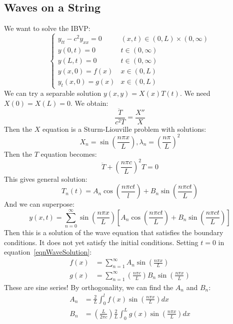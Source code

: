 \documentclass[../Main.tex]{subfiles}
\begin{document}
\subsection{Waves on a String}
We want to solve the IBVP:
\begin{equation*}
    \begin{cases}
        y_{tt} - c^2y_{xx} = 0 & (x, t) \in (0, L) \times (0, \infty) \\
        y(0, t) = 0 & t \in (0, \infty) \\
        y(L, t) = 0 & t \in (0, \infty) \\
        y(x, 0) = f(x) & x \in (0, L) \\
        y_t(x, 0) = g(x) & x \in (0, L)
    \end{cases}
\end{equation*}
We can try a separable solution $y(x, y) = X(x) T(t)$. We need $X(0) = X(L) = 0$. We obtain:
\begin{equation}
    \frac{\ddot{T}}{c^2T} = \frac{X''}{X}
    \label{eqnWaveSeparated}
\end{equation}
Then the $X$ equation is a Sturm-Liouville problem with solutions:
\begin{equation*}
    X_n = \sin\left(\frac{n\pi x}{L}\right), \lambda_n = \left(\frac{n\pi}{L}\right)^2
\end{equation*}
Then the $T$ equation becomes:
\begin{equation*}
    \ddot{T} + \left(\frac{n\pi c}{L}\right)^2 T = 0
\end{equation*}
This gives general solution:
\begin{equation*}
    T_n(t) = A_n \cos\left(\frac{n\pi c t}{l}\right) + B_n \sin\left(\frac{n\pi c t}{L}\right)
\end{equation*}
And we can superpose:
\begin{equation}
    y(x, t) = \sum_{n=0}^{\infty} \sin\left(\frac{n\pi x}{L}\right)\left[A_n \cos\left(\frac{n\pi c t}{L}\right) + B_n \sin\left(\frac{n \pi c t}{L}\right)\right]
    \label{eqnWaveSolution}
\end{equation}
Then this is a solution of the wave equation that satisfies the boundary conditions. It does not yet satisfy the initial conditions. Setting $t = 0$ in equation~\ref{eqnWaveSolution}:
\begin{align*}
    f(x) &= \sum_{n=1}^{\infty} A_n \sin\left(\frac{n \pi x}{L}\right) \\
    g(x) &= \sum_{n=1}^{\infty} \left(\frac{n\pi c}{L}\right)B_n \sin\left(\frac{n\pi x}{L}\right)
\end{align*}
These are sine series! By orthogonality, we can find the $A_n$ and $B_n$:
\begin{align*}
    A_n &= \frac{2}{L} \int_{0}^{l} f(x) \sin\left(\frac{n \pi x}{L}\right) dx \\
    B_n &= \left(\frac{L}{2\pi c}\right)\frac{2}{L} \int_{0}^{L} g(x) \sin\left(\frac{n \pi x}{L}\right) dx 
\end{align*}
\end{document}
